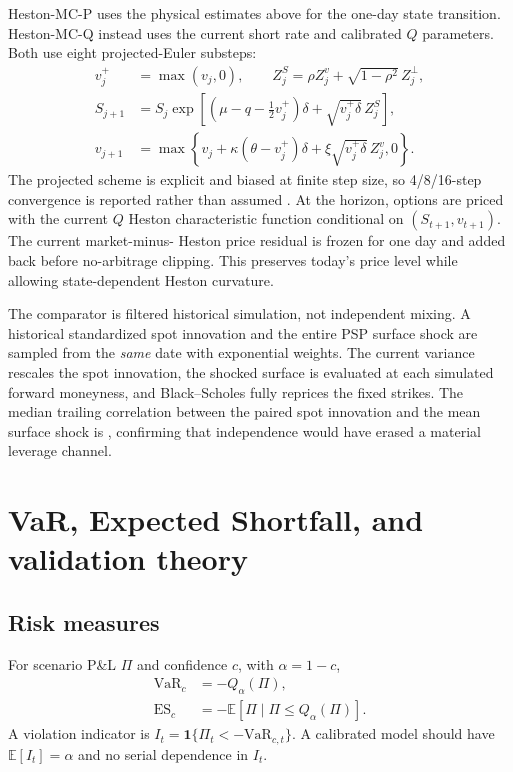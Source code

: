 \documentclass[11pt,a4paper]{article}
\begin{document}
Heston-MC-P uses the physical estimates above for the one-day state transition. Heston-MC-Q instead
uses the current short rate and calibrated $Q$ parameters. Both use eight projected-Euler substeps:
\begin{align}
v_j^+&=\max(v_j,0),\qquad
Z_j^S=\rho Z_j^v+\sqrt{1-\rho^2}\,Z_j^\perp,\\
S_{j+1}&=S_j\exp\!\left[
(\mu-q-\tfrac12v_j^+)\delta+\sqrt{v_j^+\delta}\,Z_j^S\right],\\
v_{j+1}&=\max\!\left\{v_j+\kappa(\theta-v_j^+)\delta
+\xi\sqrt{v_j^+\delta}\,Z_j^v,0\right\}.
\end{align}
The projected scheme is explicit and biased at finite step size, so 4/8/16-step convergence is
reported rather than assumed \cite{lord2010}. At the horizon, options are priced with the current
$Q$ Heston characteristic function conditional on $(S_{t+1},v_{t+1})$. The current market-minus-
Heston price residual is frozen for one day and added back before no-arbitrage clipping. This
preserves today's price level while allowing state-dependent Heston curvature.

The comparator is filtered historical simulation, not independent mixing. A historical standardized
spot innovation and the entire PSP surface shock are sampled from the \emph{same} date with
exponential weights. The current variance rescales the spot innovation, the shocked surface is
evaluated at each simulated forward moneyness, and Black--Scholes fully reprices the fixed strikes.
The median trailing correlation between the paired spot innovation and the mean surface shock is
\FullPairedCorrelation, confirming that independence would have erased a material leverage channel.

\section{VaR, Expected Shortfall, and validation theory}

\subsection{Risk measures}

For scenario P\&L $\Pi$ and confidence $c$, with $\alpha=1-c$,
\begin{align}
\mathrm{VaR}_{c}&=-Q_{\alpha}(\Pi),\\
\mathrm{ES}_{c}&=-\mathbb{E}\!\left[\Pi\mid \Pi\le Q_{\alpha}(\Pi)\right].
\end{align}
A violation indicator is $I_t=\mathbf{1}\{\Pi_t<-\mathrm{VaR}_{c,t}\}$. A calibrated model should
have $\mathbb{E}[I_t]=\alpha$ and no serial dependence in $I_t$.
\end{document}
